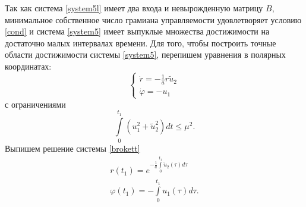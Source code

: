 \documentclass[../main.tex]{subfiles}
\begin{document}
Так как система \eqref{system5l} имеет два входа и невырожденную матрицу $ B $, минимальное собственное число грамиана управляемости удовлетворяет условию \eqref{cond} и система \eqref{system5} имеет выпуклые множества достижимости на достаточно малых интервалах времени. 
Для того, чтобы построить точные области достижимости системы  \eqref{system5}, перепишем уравнения в полярных координатах:
\begin{equation}\label{brokett}
	\left\{ {\begin{array}{*{20}{c}}
			{\dot r =  - \frac{1}{a}r{\tilde u_2}}\\
			{\dot \varphi  =  - {u_1}}
	\end{array}} \right.
\end{equation}
с ограничениями
\begin{equation*}
	\int \limits_0^{t_1} \left( u_1^2 + \tilde{u}_2^2\right) dt \leq \mu^2.
\end{equation*}
Выпишем решение системы \eqref{brokett}
\begin{equation*}
	\begin{array}{l}
		r({t_1}) = {e^{ - \frac{1}{a}\int\limits_0^{{t_1}} {{{\tilde u}_2}} (\tau )d\tau }}\\
		\varphi ({t_1}) =  - \int\limits_0^{{t_1}} {{u_1}} (\tau )d\tau. 
	\end{array}
\end{equation*}
\end{document}
